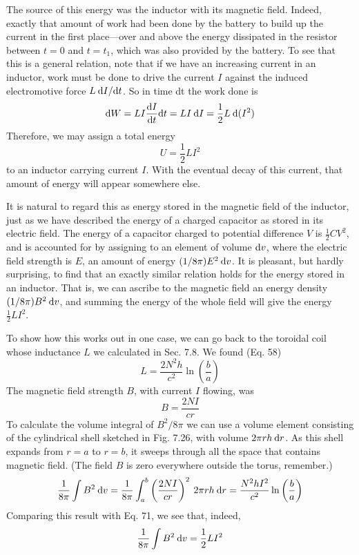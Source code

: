 The source of this energy was the inductor with its magnetic field.
Indeed, exactly that amount of work had been done by the battery
to build up the current in the first place---over and above the energy
dissipated in the resistor between $t = 0$ and $t = t_1$, which was also
provided by the battery. To see that this is a general relation, note
that if we have an increasing current in an inductor, work must be
done to drive the current $I$ against the induced electromotive force
$L\:\textup{d} I/\textup{d} t$. So in time dt the work done is
\begin{equation}
  \textup{d} W = LI\frac{\textup{d} I}{\textup{d} t} \textup{d} t
         = LI\:\textup{d} I
         = \frac{1}{2}L\:\textup{d}(I^2)
\end{equation}
Therefore, we may assign a total energy
\begin{equation}
  U = \frac{1}{2}LI^2
\end{equation}
to an inductor carrying current $I$. With the eventual decay of this
current, that amount of energy will appear somewhere else.

It is natural to regard this as energy stored in the magnetic field
of the inductor, just as we have described the energy of a charged
capacitor as stored in its electric field. The energy of a capacitor
charged to potential difference $V$ is $\frac{1}{2}CV^2$, and is accounted for by
assigning to an element of volume $\textup{d} v$, where the electric field strength
is $E$, an amount of energy $(1/8\pi)E^2\: \textup{d} v$. It is pleasant, but hardly
surprising, to find that an exactly similar relation holds for the energy
stored in an inductor. That is, we can ascribe to the magnetic field
an energy density $(1/8\pi)B^2\: \textup{d} v$, and summing the energy of the whole
field will give the energy $\frac{1}{2}LI^2$.

To show how this works out in one case, we can go back to the
toroidal coil whose inductance $L$ we calculated in Sec. 7.8. We
found (Eq. 58)
\begin{equation}
  L = \frac{2N^2h}{c^2}\ln\left(\frac{b}{a}\right)
\end{equation}
The magnetic field strength $B$, with current $I$ flowing, was
\begin{equation}
  B = \frac{2NI}{cr}
\end{equation}
To calculate the volume integral of $B^2/8\pi$ we can use a volume element
consisting of the cylindrical shell sketched in Fig. 7.26, with
volume $2\pi rh\:\textup{d} r$. As this shell expands from $r = a$ to $r = b$, it sweeps
through all the space that contains magnetic field. (The field $B$ is
zero everywhere outside the torus, remember.)
\begin{equation}
  \frac{1}{8\pi}\int B^2\:\textup{d} v = \frac{1}{8\pi}\int_a^b\left(\frac{2NI}{cr}\right)^2 \: 2\pi rh\:\textup{d} r
        = \frac{N^2hI^2}{c^2} \ln\left(\frac{b}{a}\right)
\end{equation}
Comparing this result with Eq. 71, we see that, indeed,
\begin{equation}
  \frac{1}{8\pi}\int B^2\:\textup{d} v = \frac{1}{2}LI^2
\end{equation}


